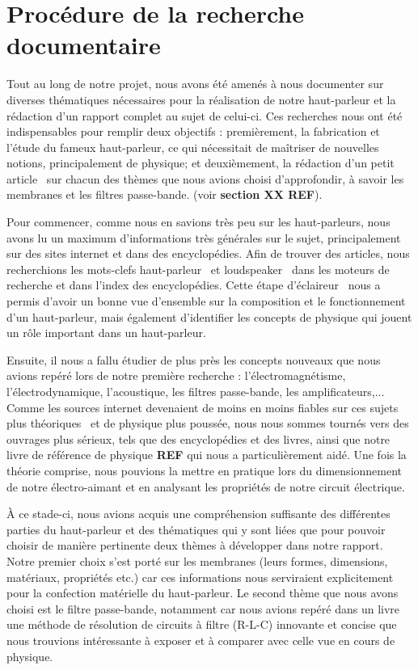
\section{Procédure de la recherche documentaire} 
\label{sec:app/demarche}

Tout au long de notre projet, nous avons été amenés à nous documenter sur diverses thématiques nécessaires pour la réalisation de notre haut-parleur et la rédaction d'un rapport complet au sujet de celui-ci.
Ces recherches nous ont été indispensables pour remplir deux objectifs : premièrement, la fabrication et l'étude du fameux haut-parleur, ce qui nécessitait de maîtriser de nouvelles notions, principalement de physique; et deuxièmement, la rédaction d'un petit \og article \fg\ sur chacun des thèmes que nous avions choisi d'approfondir, à savoir les membranes et les filtres passe-bande. (voir \textbf{section XX REF}). %
\newline

Pour commencer, comme nous en savions très peu sur les haut-parleurs, nous avons lu un maximum d’informations très générales sur le sujet, principalement sur des sites internet et dans des encyclopédies. Afin de trouver des articles, nous recherchions les mots-clefs \og haut-parleur \fg\ et \og loudspeaker \fg\ dans les moteurs de recherche et dans l'index des encyclopédies. 
Cette étape \og d'éclaireur \fg\ nous a permis d'avoir un bonne vue d’ensemble sur la composition et le fonctionnement d’un haut-parleur, mais également d'identifier les concepts de physique qui jouent un rôle important dans un haut-parleur.  


Ensuite, il nous a fallu étudier de plus près les concepts nouveaux que nous avions repéré lors de notre première recherche : l'électromagnétisme, l'électrodynamique, l’acoustique, les filtres passe-bande, les amplificateurs,... Comme les sources internet devenaient de moins en moins fiables sur ces sujets plus \og théoriques \fg\ et de physique plus poussée, nous nous sommes tournés vers des ouvrages plus sérieux, tels que des encyclopédies et des livres, ainsi que notre livre de référence de physique \textbf{REF} %
qui nous a particulièrement aidé. Une fois la théorie comprise, nous pouvions la mettre en pratique lors du dimensionnement de notre électro-aimant et en analysant les propriétés de notre circuit électrique. 
\newline

À ce stade-ci, nous avions acquis une compréhension suffisante des différentes parties du haut-parleur et des thématiques qui y sont liées que pour pouvoir choisir de manière pertinente deux thèmes à développer dans notre rapport. Notre premier choix s'est  porté sur les membranes (leurs formes, dimensions, matériaux, propriétés etc.) car ces informations nous serviraient explicitement pour la confection matérielle du haut-parleur. Le second thème que nous avons choisi est le filtre passe-bande, notamment car nous avions repéré dans un livre une méthode de résolution de circuits à filtre (R-L-C) innovante et concise que nous trouvions intéressante à exposer et à comparer avec celle vue en cours de physique. 

